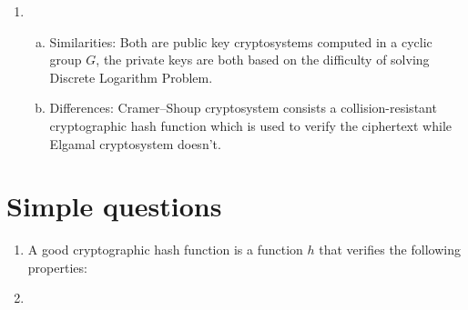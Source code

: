 \documentclass{article}
\begin{document}
\begin{enumerate}
\item
\begin{enumerate}[a)]
\item Similarities: Both are public key cryptosystems computed in a cyclic group $G$, the private keys are both based on the difficulty of solving Discrete Logarithm Problem.
\item Differences: Cramer–Shoup cryptosystem consists a collision-resistant cryptographic hash function which is used to verify the ciphertext while Elgamal cryptosystem doesn't.

\end{enumerate}

\end{enumerate}


\section{Simple questions}
\begin{enumerate}
\item
A good cryptographic hash function is a function $h$ that verifies the following properties:

\item
\end{enumerate}
\end{document}
